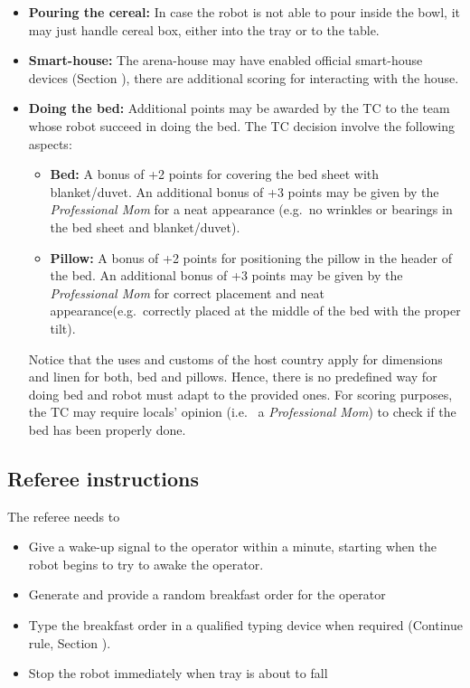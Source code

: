 \begin{itemize}
	\item \textbf{Pouring the cereal:} In case the robot is not able to pour inside the bowl, it may just handle cereal box, either into the tray or to the table.

	\item \textbf{Smart-house:} The arena-house may have enabled official smart-house devices (Section ), there are additional scoring for interacting with the house.

	\item \textbf{Doing the bed:} Additional points may be awarded by the TC to the team whose robot succeed in doing the bed. The TC decision involve the following aspects:
	\begin{itemize}
		\item \textbf{Bed:} A bonus of +2 points for covering the bed sheet with blanket/duvet. An additional bonus of +3 points may be given by the \textit{Professional Mom} for a neat appearance (e.g.~no wrinkles or bearings in the bed sheet and blanket/duvet).
		\item \textbf{Pillow:} A bonus of +2 points for positioning the pillow in the header of the bed. An additional bonus of +3 points may be given by the \textit{Professional Mom} for correct placement and neat appearance(e.g.~correctly placed at the middle of the bed with the proper tilt).
	\end{itemize}
	Notice that the uses and customs of the host country apply for dimensions and linen for both, bed and pillows. Hence, there is no predefined way for doing bed and robot must adapt to the provided ones. For scoring purposes, the TC may require locals' opinion (i.e.~ a \textit{Professional Mom}) to check if the bed has been properly done.
\end{itemize}

\subsection{Referee instructions}

The referee needs to
\begin{itemize}
	\item Give a wake-up signal to the operator within a minute, starting when the robot begins to try to awake the operator.
	\item Generate and provide a random breakfast order for the operator
	\item Type the breakfast order in a qualified typing device when required (Continue rule, Section ).
	\item Stop the robot immediately when tray is about to fall
\end{itemize}

